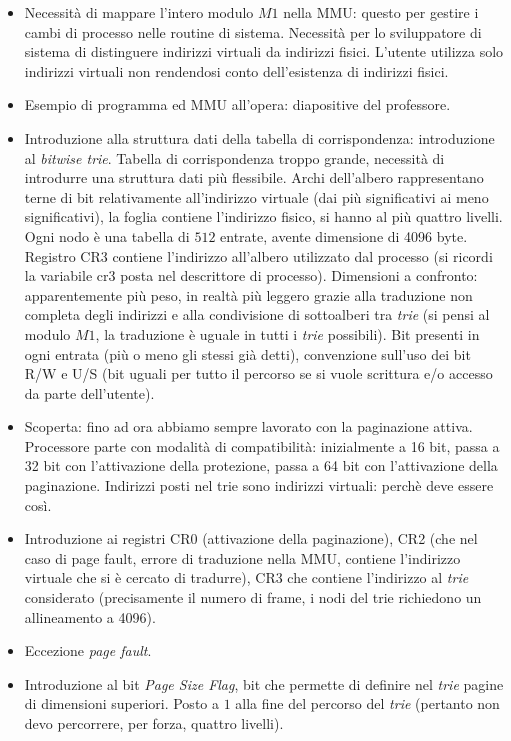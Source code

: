 \documentclass[11pt]{report}
\theoremstyle{definition}
\begin{document}
\begin{itemize}
\begin{itemize}
		\item Necessità di mappare l'intero modulo $M1$ nella MMU: questo per gestire i cambi di processo nelle routine di sistema. Necessità per lo sviluppatore di sistema di distinguere indirizzi virtuali da indirizzi fisici. L'utente utilizza solo indirizzi virtuali non rendendosi conto dell'esistenza di indirizzi fisici.
		\item Esempio di programma ed MMU all'opera: diapositive del professore. 
		\item Introduzione alla struttura dati della tabella di corrispondenza: introduzione al \emph{bitwise trie}. Tabella di corrispondenza troppo grande, necessità di introdurre una struttura dati più flessibile. Archi dell'albero rappresentano terne di bit relativamente all'indirizzo virtuale (dai più significativi ai meno significativi), la foglia contiene l'indirizzo fisico, si hanno al più quattro livelli. Ogni nodo è una tabella di $512$ entrate, avente dimensione di 4096 byte. Registro CR3 contiene l'indirizzo all'albero utilizzato dal processo (si ricordi la variabile cr3 posta nel descrittore di processo). Dimensioni a confronto: apparentemente più peso, in realtà più leggero grazie alla traduzione non completa degli indirizzi e alla condivisione di sottoalberi tra \emph{trie} (si pensi al modulo $M1$, la traduzione è uguale in tutti i \emph{trie} possibili). Bit presenti in ogni entrata (più o meno gli stessi già detti), convenzione sull'uso dei bit R/W e U/S (bit uguali per tutto il percorso se si vuole scrittura e/o accesso da parte dell'utente).
		\item Scoperta: fino ad ora abbiamo sempre lavorato con la paginazione attiva. Processore parte con modalità di compatibilità: inizialmente a 16 bit, passa a 32 bit con l'attivazione della protezione, passa a 64 bit con l'attivazione della paginazione. Indirizzi posti nel trie sono indirizzi virtuali: perchè deve essere così.
		\item Introduzione ai registri CR0 (attivazione della paginazione), CR2 (che nel caso di page fault, errore di traduzione nella MMU, contiene l'indirizzo virtuale che si è cercato di tradurre), CR3 che contiene l'indirizzo al \emph{trie} considerato (precisamente il numero di frame, i nodi del trie richiedono un allineamento a 4096). 
		\item Eccezione \emph{page fault}.
		\item Introduzione al bit \emph{Page Size Flag}, bit che permette di definire nel \emph{trie} pagine di dimensioni superiori. Posto a $1$ alla fine del percorso del \emph{trie} (pertanto non devo percorrere, per forza, quattro livelli).

\end{itemize}
\end{itemize}
\end{document}
